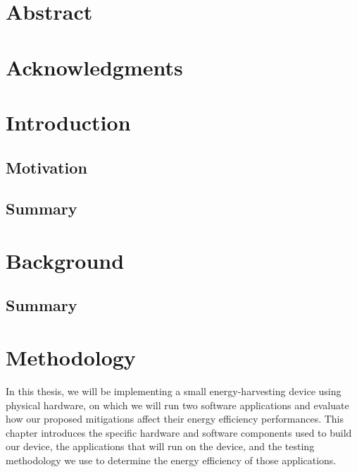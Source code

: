 \documentclass[twoside]{report}
\begin{document}
\tableofcontents
\listoffigures
\listoftables
\onehalfspacing
\chapter*{Abstract}
\chapter*{Acknowledgments}
\chapter{Introduction}
\section{Motivation}
\section{Summary}

\chapter{Background}
\section{Summary}

\chapter{Methodology}
In this thesis, we will be implementing a small energy-harvesting device using physical hardware, 
on which we will run two software applications and evaluate how our proposed mitigations affect 
their energy efficiency performances. 
This chapter introduces the specific hardware and software components used to build our device, 
the applications that will run on the device, 
and the testing methodology we use to determine the energy efficiency of those applications.
\end{document}
